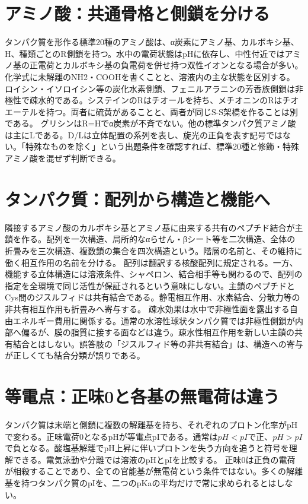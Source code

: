 \section{アミノ酸：共通骨格と側鎖を分ける}
\label{theory:biology:amino}
タンパク質を形作る標準20種のアミノ酸は、α炭素にアミノ基、カルボキシ基、H、種類ごとのR側鎖を持つ。水中の電荷状態はpHに依存し、中性付近ではアミノ基の正電荷とカルボキシ基の負電荷を併せ持つ双性イオンとなる場合が多い\autocite{mit_amino}。化学式に未解離のNH2・COOHを書くことと、溶液内の主な状態を区別する。
ロイシン・イソロイシン等の炭化水素側鎖、フェニルアラニンの芳香族側鎖は非極性で疎水的である。システインのRはチオールを持ち、メチオニンのRはチオエーテルを持つ。両者に硫黄があることと、両者が同じS-S架橋を作ることは別である。
グリシンはR=Hでα炭素が不斉でない。他の標準タンパク質アミノ酸は主にLである。D/Lは立体配置の系列を表し、旋光の正負を表す記号ではない。「特殊なものを除く」という出題条件を確認すれば、標準20種と修飾・特殊アミノ酸を混ぜず判断できる。

\section{タンパク質：配列から構造と機能へ}
\label{theory:biology:protein}
隣接するアミノ酸のカルボキシ基とアミノ基に由来する共有のペプチド結合が主鎖を作る。配列を一次構造、局所的なαらせん・βシート等を二次構造、全体の折畳みを三次構造、複数鎖の集合を四次構造という\autocite{mit_protein}。階層の名前と、その維持に働く相互作用の名前を分ける。
配列は翻訳する核酸配列に規定される。一方、機能する立体構造には溶液条件、シャペロン、結合相手等も関わるので、配列の指定を全環境で同じ活性が保証されるという意味にしない。主鎖のペプチドとCys間のジスルフィドは共有結合である。静電相互作用、水素結合、分散力等の非共有相互作用も折畳みへ寄与する。
疎水効果は水中で非極性面を露出する自由エネルギー費用に関係する。通常の水溶性球状タンパク質では非極性側鎖が内部へ偏るが、膜の脂質に接する面などは違う。疎水性相互作用を新しい主鎖の共有結合とはしない。誤答肢の「ジスルフィド等の非共有結合」は、構造への寄与が正しくても結合分類が誤りである。

\section{等電点：正味0と各基の無電荷は違う}
\label{theory:biology:charge}
タンパク質は末端と側鎖に複数の解離基を持ち、それぞれのプロトン化率がpHで変わる。正味電荷0となるpHが等電点pIである。通常は\(pH<pI\)で正、\(pH>pI\)で負となる。酸塩基解離でpH上昇に伴いプロトンを失う方向を追うと符号を理解できる。電気泳動や分離では溶液のpHとpIを比較する\autocite{mit_protein}。
正味0は正負の電荷が相殺することであり、全ての官能基が無電荷という条件ではない。多くの解離基を持つタンパク質のpIを、二つのpKaの平均だけで常に求められるとはしない。

